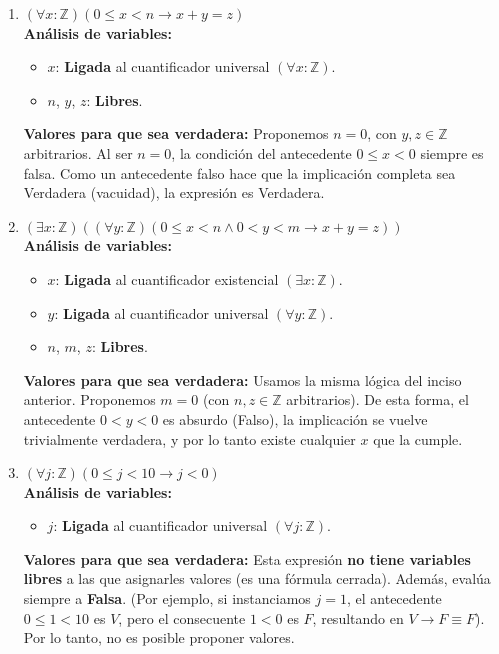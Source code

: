 \begin{enumerate}[label=\textbf{\alph*)}]

    \item \textbf{$(\forall x: \mathbb{Z}) (0 \leq x < n \rightarrow x + y = z)$} \\
    \textbf{Análisis de variables:}
    \begin{itemize}
        \item $x$: \textbf{Ligada} al cuantificador universal $(\forall x: \mathbb{Z})$.
        \item $n$, $y$, $z$: \textbf{Libres}.
    \end{itemize}
    \textbf{Valores para que sea verdadera:} Proponemos $n = 0$, con $y, z \in \mathbb{Z}$ arbitrarios. Al ser $n=0$, la condición del antecedente $0 \leq x < 0$ siempre es falsa. Como un antecedente falso hace que la implicación completa sea Verdadera (vacuidad), la expresión es Verdadera.

    \vspace{0.4cm}
    \item \textbf{$(\exists x: \mathbb{Z}) ((\forall y: \mathbb{Z}) (0 \leq x < n \wedge 0 < y < m \rightarrow x + y = z))$} \\
    \textbf{Análisis de variables:}
    \begin{itemize}
        \item $x$: \textbf{Ligada} al cuantificador existencial $(\exists x: \mathbb{Z})$.
        \item $y$: \textbf{Ligada} al cuantificador universal $(\forall y: \mathbb{Z})$.
        \item $n$, $m$, $z$: \textbf{Libres}.
    \end{itemize}
    \textbf{Valores para que sea verdadera:} Usamos la misma lógica del inciso anterior. Proponemos $m = 0$ (con $n, z \in \mathbb{Z}$ arbitrarios). De esta forma, el antecedente $0 < y < 0$ es absurdo (Falso), la implicación se vuelve trivialmente verdadera, y por lo tanto existe cualquier $x$ que la cumple.

    \vspace{0.4cm}
    \item \textbf{$(\forall j: \mathbb{Z}) (0 \leq j < 10 \rightarrow j < 0)$} \\
    \textbf{Análisis de variables:}
    \begin{itemize}
        \item $j$: \textbf{Ligada} al cuantificador universal $(\forall j: \mathbb{Z})$.
    \end{itemize}
    \textbf{Valores para que sea verdadera:} Esta expresión \textbf{no tiene variables libres} a las que asignarles valores (es una fórmula cerrada). Además, evalúa siempre a \textbf{Falsa}. (Por ejemplo, si instanciamos $j=1$, el antecedente $0 \leq 1 < 10$ es $V$, pero el consecuente $1 < 0$ es $F$, resultando en $V \rightarrow F \equiv F$). Por lo tanto, no es posible proponer valores.


\end{enumerate}
